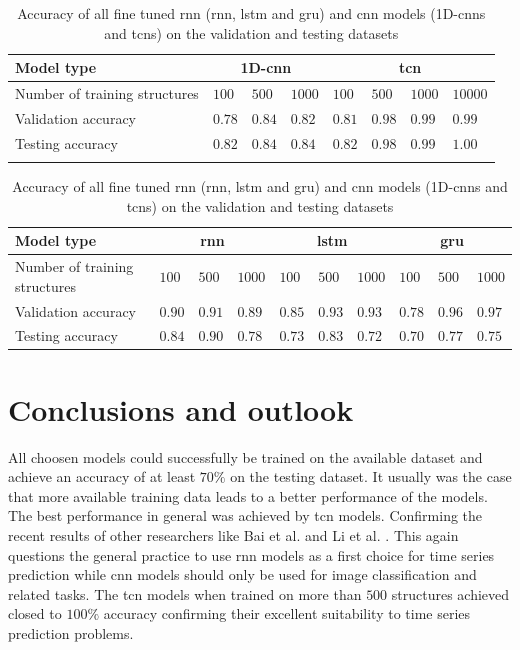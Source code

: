 \documentclass[conference]{IEEEtran}
\begin{document}
\begin{table}[htp]
	\centering
	\caption{Accuracy of all fine tuned \gls{rnn} (\gls{rnn}, \gls{lstm} and \gls{gru}) and \gls{cnn} models (1D-\glspl{cnn} and \glspl{tcn}) on the validation and testing datasets}
	\label{tab:accuracy_testing_rnn_cnn}
	\setlength{\tabcolsep}{3pt} %
	\begin{tabular}{p{2.5cm}|lll|llll}
		Model type & \multicolumn{3}{c|}{1D-\gls{cnn}} & \multicolumn{4}{c}{\gls{tcn}} \\
		\hline
		Number of training structures & $ 100 $ & $ 500 $ & $ 1000 $ & $ 100 $ & $ 500 $ & $ 1000 $ & $ 10000 $ \\
		Validation accuracy & $ 0.78 $ & $ 0.84 $ & $ 0.82 $ & $ 0.81 $ & $ 0.98 $ & $ 0.99 $ & $ 0.99 $ \\
		Testing accuracy & $ 0.82 $ & $ 0.84 $ & $ 0.84 $ & $ 0.82 $ & $ 0.98 $ & $ 0.99 $ & $ 1.00 $ \\
		\multicolumn{8}{c}{}
	\end{tabular}

	\setlength{\tabcolsep}{2pt} %
	\begin{tabular}{p{2.5cm}|lll|lll|lll}
		Model type & \multicolumn{3}{c|}{\gls{rnn}} & \multicolumn{3}{c|}{\gls{lstm}} &  \multicolumn{3}{c}{\gls{gru}}\\
		\hline
		Number of training structures & $ 100 $ & $ 500 $ & $ 1000 $ & $ 100 $ & $ 500 $ & $ 1000 $ & $ 100 $ & $ 500 $ & $ 1000 $ \\
		Validation accuracy & $ 0.90 $ & $ 0.91 $ & $ 0.89 $ & $ 0.85 $ & $ 0.93 $ & $ 0.93 $ & $ 0.78 $ & $ 0.96 $ & $ 0.97 $ \\
		Testing accuracy & $ 0.84 $ & $ 0.90 $ & $ 0.78 $ & $ 0.73 $ & $ 0.83 $ & $ 0.72 $ & $ 0.70 $ & $ 0.77 $ & $ 0.75 $
	\end{tabular}

\end{table}


\section{Conclusions and outlook}
\label{sec:conclusions_outlook}

All choosen models could successfully be trained on the available dataset and achieve an accuracy of at least $ 70 \% $ on the testing dataset. It usually was the case that more available training data leads to a better performance of the models. The best performance in general was achieved by \gls{tcn} models. Confirming the recent results of other researchers like Bai et al. \cite{Bai2018} and Li et al. \cite{Li2018}. This again questions the general practice to use \gls{rnn} models as a first choice for time series prediction while \gls{cnn} models should only be used for image classification and related tasks. The \gls{tcn} models when trained on more than $ 500 $ structures achieved closed to $ 100 \% $ accuracy confirming their excellent suitability to time series prediction problems.
\end{document}
